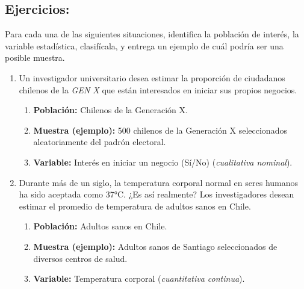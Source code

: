 \documentclass[12pt, letterpaper]{article}
\begin{document}
\subsection{Ejercicios:}
Para cada una de las siguientes situaciones, identifica la población de interés, la variable estadística, clasifícala, y entrega un ejemplo de cuál podría ser una posible muestra.

\begin{enumerate}
	\item Un investigador universitario desea estimar la proporción de ciudadanos chilenos de la \textit{GEN X} que están interesados en iniciar sus propios negocios.
	      \begin{enumerate}
		      \item \textbf{Población:} Chilenos de la Generación X.
		      \item \textbf{Muestra (ejemplo):} 500 chilenos de la Generación X seleccionados aleatoriamente del padrón electoral.
		      \item \textbf{Variable:} Interés en iniciar un negocio (Sí/No) (\textit{cualitativa nominal}).
	      \end{enumerate}

	\item Durante más de un siglo, la temperatura corporal normal en seres humanos ha sido aceptada como 37°C. ¿Es así realmente? Los investigadores desean estimar el promedio de temperatura de adultos sanos en Chile.
	      \begin{enumerate}
		      \item \textbf{Población:} Adultos sanos en Chile.
		      \item \textbf{Muestra (ejemplo):} Adultos sanos de Santiago seleccionados de diversos centros de salud.
		      \item \textbf{Variable:} Temperatura corporal (\textit{cuantitativa continua}).
	      \end{enumerate}


\end{enumerate}
\end{document}
